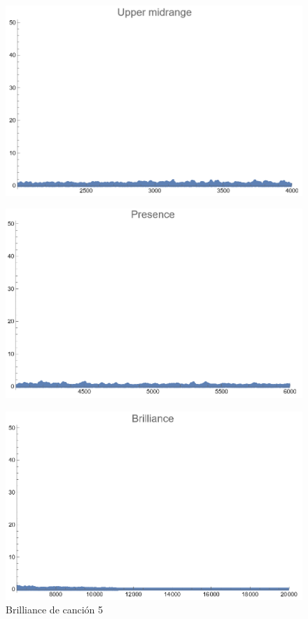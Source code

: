 \documentclass[12pt, letterpaper]{article}
\begin{document}
\begin{figure}[H]
  \centering
  \begin{minipage}{.5\textwidth}
    \centering
    \includegraphics[width=.9\linewidth]{imgs/Cancion5/upmid.png}
    \label{fig:05f}
  \end{minipage}%
  \begin{minipage}{.5\textwidth}
    \centering
    \includegraphics[width=.9\linewidth]{imgs/Cancion5/presence.png}
    \label{fig:05g}
  \end{minipage}
\end{figure}
\begin{figure}[H]
  \centering
  \includegraphics[width=.45\linewidth]{imgs/Cancion5/brilliance.png}
  \caption{Brilliance de canción 5}
  \label{fig:05h}
\end{figure}
\end{document}
